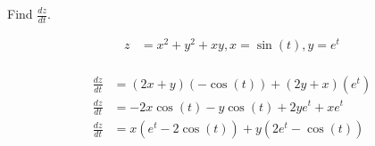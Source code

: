 Find $\frac{dz}{dt}$.

\begin{align*}
    z &= x^2 + y^2 + xy, x = \sin(t), y=e^t \\
\end{align*}

\begin{solution}
\begin{align*}
    \frac{dz}{dt} &= (2x+y)(-\cos(t)) + (2y+x)\left(e^t\right) \\
    \frac{dz}{dt} &= -2x\cos(t) - y\cos(t) + 2ye^t + xe^t \\
    \frac{dz}{dt} &= x\left(e^t - 2\cos(t)\right) + y\left(2e^t - \cos(t)\right)
\end{align*}
\end{solution}
